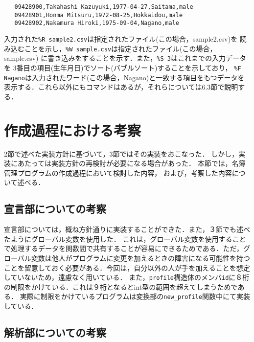 \documentclass[a4paper,11pt]{jarticle}
\begin{document}
{\fontsize{10pt}{11pt} \selectfont
 \begin{verbatim}
   09428900,Takahashi Kazuyuki,1977-04-27,Saitama,male
   09428901,Honma Mitsuru,1972-08-25,Hokkaidou,male
   09428902,Nakamura Hiroki,1975-09-04,Nagano,male
  \end{verbatim}
}
\noindent
入力された\verb|%R sample2.csv|は指定されたファイル(この場合，sample2.csv)を
読み込むことを示し，\verb|%W sample.csv|は指定されたファイル(この場合，sample.csv)
に書き込みをすることを示す．また，\verb|%S 3|はこれまでの入力データを
3番目の項目(生年月日)でソート(バブルソート)することを示しており，
\verb|%F Nagano|は入力されたワード(この場合，Nagano)と一致する項目をもつデータを
表示する．これら以外にもコマンドはあるが，それらについては$6.3$節で説明する．

\section{作成過程における考察}


2節で述べた実装方針に基づいて，3節ではその実装をおこなった．
しかし，実装にあたっては実装方針の再検討が必要になる場合があった．
本節では，名簿管理プログラムの作成過程において検討した内容，
および，考察した内容について述べる．

\subsection{宣言部についての考察}

宣言部については，概ね方針通りに実装することができた．また，３節でも述べたようにグローバル変数を使用した．
これは，グローバル変数を使用することで処理するデータを関数間で共有することが容易にできるためである．ただ，グローバル変数は他人がプログラムに変更を加えるときの障害になる可能性を持つことを留意しておく必要がある．今回は，自分以外の人が手を加えることを想定していないため，遠慮なく用いている．
また，\verb|profile|構造体のメンバ\verb|id|に８桁の制限をかけている．これは９桁となるとint型の範囲を超えてしまうためである．
実際に制限をかけているプログラムは変換部の\verb|new_profile|関数中にて実装している．
\subsection{解析部についての考察}
\end{document}
